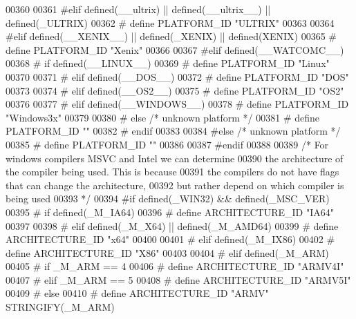 \begin{DoxyCode}
{{{{{{{{{{{{{{{{{{{{{{{{{{{{{{{{{{{{00360 
00361 \textcolor{preprocessor}{#elif defined(\_\_ultrix) || defined(\_\_ultrix\_\_) || defined(\_ULTRIX)}
00362 \textcolor{preprocessor}{# define PLATFORM\_ID "ULTRIX"}
00363 
00364 \textcolor{preprocessor}{#elif defined(\_\_XENIX\_\_) || defined(\_XENIX) || defined(XENIX)}
00365 \textcolor{preprocessor}{# define PLATFORM\_ID "Xenix"}
00366 
00367 \textcolor{preprocessor}{#elif defined(\_\_WATCOMC\_\_)}
00368 \textcolor{preprocessor}{# if defined(\_\_LINUX\_\_)}
00369 \textcolor{preprocessor}{#  define PLATFORM\_ID "Linux"}
00370 
00371 \textcolor{preprocessor}{# elif defined(\_\_DOS\_\_)}
00372 \textcolor{preprocessor}{#  define PLATFORM\_ID "DOS"}
00373 
00374 \textcolor{preprocessor}{# elif defined(\_\_OS2\_\_)}
00375 \textcolor{preprocessor}{#  define PLATFORM\_ID "OS2"}
00376 
00377 \textcolor{preprocessor}{# elif defined(\_\_WINDOWS\_\_)}
00378 \textcolor{preprocessor}{#  define PLATFORM\_ID "Windows3x"}
00379 
00380 \textcolor{preprocessor}{# else }\textcolor{comment}{/* unknown platform */}\textcolor{preprocessor}{}
00381 \textcolor{preprocessor}{#  define PLATFORM\_ID ""}
00382 \textcolor{preprocessor}{# endif}
00383 
00384 \textcolor{preprocessor}{#else }\textcolor{comment}{/* unknown platform */}\textcolor{preprocessor}{}
00385 \textcolor{preprocessor}{# define PLATFORM\_ID ""}
00386 
00387 \textcolor{preprocessor}{#endif}
00388 
00389 \textcolor{comment}{/* For windows compilers MSVC and Intel we can determine}
00390 \textcolor{comment}{   the architecture of the compiler being used.  This is because}
00391 \textcolor{comment}{   the compilers do not have flags that can change the architecture,}
00392 \textcolor{comment}{   but rather depend on which compiler is being used}
00393 \textcolor{comment}{*/}
00394 \textcolor{preprocessor}{#if defined(\_WIN32) && defined(\_MSC\_VER)}
00395 \textcolor{preprocessor}{# if defined(\_M\_IA64)}
00396 \textcolor{preprocessor}{#  define ARCHITECTURE\_ID "IA64"}
00397 
00398 \textcolor{preprocessor}{# elif defined(\_M\_X64) || defined(\_M\_AMD64)}
00399 \textcolor{preprocessor}{#  define ARCHITECTURE\_ID "x64"}
00400 
00401 \textcolor{preprocessor}{# elif defined(\_M\_IX86)}
00402 \textcolor{preprocessor}{#  define ARCHITECTURE\_ID "X86"}
00403 
00404 \textcolor{preprocessor}{# elif defined(\_M\_ARM)}
00405 \textcolor{preprocessor}{#  if \_M\_ARM == 4}
00406 \textcolor{preprocessor}{#   define ARCHITECTURE\_ID "ARMV4I"}
00407 \textcolor{preprocessor}{#  elif \_M\_ARM == 5}
00408 \textcolor{preprocessor}{#   define ARCHITECTURE\_ID "ARMV5I"}
00409 \textcolor{preprocessor}{#  else}
00410 \textcolor{preprocessor}{#   define ARCHITECTURE\_ID "ARMV" STRINGIFY(\_M\_ARM)}
}}}}}}}}}}}}}}}}}}}}}}}}}}}}}}}}}}}}
\end{DoxyCode}
